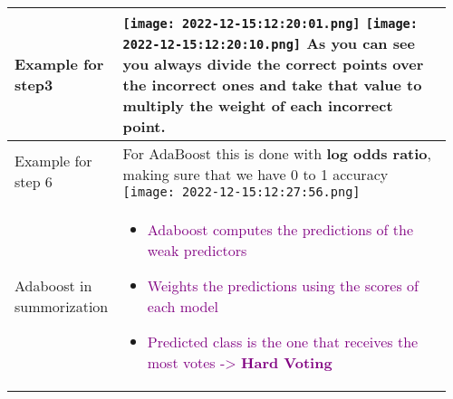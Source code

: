 \documentclass[main.tex,fontsize=8pt,paper=a4,paper=portrait,DIV=calc,]{scrartcl}
\begin{document}
\begin{table}[ht!]
\begin{tabular}{|m{0.2\linewidth}|m{0.755\linewidth}|}
\hline
Example for step3 & 
\vspace{2mm}
\texttt{[image: 2022-12-15:12:20:01.png]}\newline
\texttt{[image: 2022-12-15:12:20:10.png]}\newline
As you can see you always divide the correct points over the incorrect ones and take that value to multiply the weight of each incorrect point.
\\
\hline
Example for step 6& 
For AdaBoost this is done with \textbf{log odds ratio}, making sure that we have 0 to 1 accuracy\newline
\texttt{[image: 2022-12-15:12:27:56.png]}
\\
\hline
Adaboost in summorization &
\vspace{2mm}
\begin{itemize}
\item \textcolor{purple}{Adaboost computes the predictions of the weak predictors}
\item \textcolor{purple}{Weights the predictions using the scores of each model}
\item \textcolor{purple}{Predicted class is the one that receives the most votes -> \textbf{Hard Voting}}
\vspace{-3mm}
\end{itemize} 
\\
\hline
\end{tabular}

\end{table}
\end{document}

